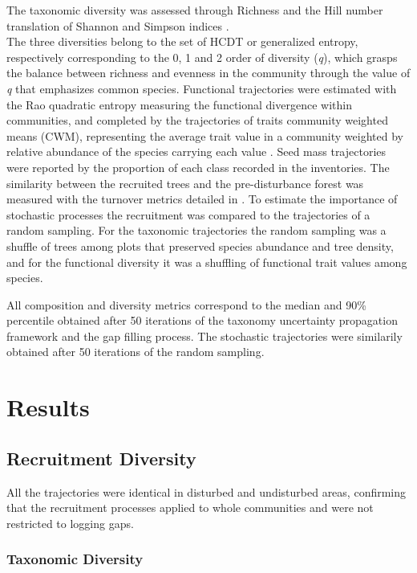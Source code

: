 \documentclass[fleqn,10pt]{ArtEcoFoG} %
\begin{document}
The taxonomic diversity was assessed through Richness and the Hill
number translation of Shannon and Simpson indices
\citep{Hill1973, chao2015estimating, Marcon2015b}.\\
The three diversities belong to the set of HCDT or generalized entropy,
respectively corresponding to the 0, 1 and 2 order of diversity
(\emph{q}), which grasps the balance between richness and evenness in
the community through the value of \emph{q} that emphasizes common
species. Functional trajectories were estimated with the Rao quadratic
entropy measuring the functional divergence within communities, and
completed by the trajectories of traits community weighted means (CWM),
representing the average trait value in a community weighted by relative
abundance of the species carrying each value
\citep{Diaz2007, Garnier2004}. Seed mass trajectories were reported by
the proportion of each class recorded in the inventories. The similarity
between the recruited trees and the pre-disturbance forest was measured
with the turnover metrics detailed in \citet{Podani2013a}. To estimate
the importance of stochastic processes the recruitment was compared to
the trajectories of a random sampling. For the taxonomic trajectories
the random sampling was a shuffle of trees among plots that preserved
species abundance and tree density, and for the functional diversity it
was a shuffling of functional trait values among species.

All composition and diversity metrics correspond to the median and 90\%
percentile obtained after 50 iterations of the taxonomy uncertainty
propagation framework and the gap filling process. The stochastic
trajectories were similarily obtained after 50 iterations of the random
sampling.

\section{Results}\label{results}

\subsection{Recruitment Diversity}\label{recruitment-diversity}

All the trajectories were identical in disturbed and undisturbed areas,
confirming that the recruitment processes applied to whole communities
and were not restricted to logging gaps.

\subsubsection{Taxonomic Diversity}\label{taxonomic-diversity}
\end{document}
